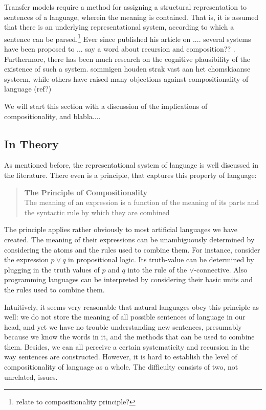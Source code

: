 \documentclass{report}
\theoremstyle{definition}
\theoremstyle{plain}
\begin{document}
Transfer models require a method for assigning a structural representation to sentences of a language, wherein the meaning is contained. That is, it is assumed that there is an underlying representational system, according to which a sentence can be parsed.\footnote{relate to compositionality principle?} Ever since \cite{chomsky1956three} published his article on .... several systems have been proposed to 
... say a word about recursion and composition??
. Furthermore, there has been much research on the cognitive plausibility of the existence of such a system. sommigen houden strak vast aan het chomskiaanse systeem, while others have raised many objections against compositionality of language (ref?)

We will start this section with a discussion of the implications of compositionality, and blabla....

\subsection{In Theory}

As mentioned before, the representational system of language is well discussed in the literature. There even is a principle, that captures this property of language:

\begin{quote}
\textbf{The Principle of Compositionality}\\
The meaning of an expression is a function of the meaning of its parts and the syntactic rule by which they are combined \citep{partee1984compositionality}
\end{quote}

The principle applies rather obviously to most artificial languages we have created. The meaning of their expressions can be unambiguously determined by considering the atoms and the rules used to combine them. For instance, consider the expression $p\lor q$ in propositional logic. Its truth-value can be determined by plugging in the truth values of $p$ and $q$ into the rule of the $\lor$-connective. Also programming languages can be interpreted by considering their basic units and the rules used to combine them.

Intuitively, it seems very reasonable that natural languages obey this principle as well: we do not store the meaning of all possible sentences of language in our head, and yet we have no trouble understanding new sentences, presumably because we know the words in it, and the methods that can be used to combine them. Besides, we can all perceive a certain systematicity and recursion in the way sentences are constructed. However, it is hard to establish the level of compositionality of language as a whole. The difficulty consists of two, not unrelated, issues.
\end{document}
